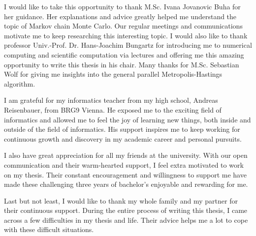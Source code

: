 I would like to take this opportunity to thank M.Sc. Ivana Jovanovic Buha for her guidance. Her explanations and advice greatly helped me understand the topic of Markov chain Monte Carlo. Our regular meetings and communications motivate me to keep researching this interesting topic. I would also like to thank professor Univ.-Prof. Dr. Hans-Joachim Bungartz for introducing me to numerical computing and scientific computation via lectures and offering me this amazing opportunity to write this thesis in his chair. Many thanks for M.Sc. Sebastian Wolf for giving me insights into the general parallel Metropolis-Hastings algorithm.

I am grateful for my informatics teacher from my high school, Andreas Reisenbauer, from BRG9 Vienna. He exposed me to the exciting field of informatics and allowed me to feel the joy of learning new things, both inside and outside of the field of informatics. His support inspires me to keep working for continuous growth and discovery in my academic career and personal pursuits.

I also have great appreciation for all my friends at the university. With our open communication and their warm-hearted support, I feel extra motivated to work on my thesis. Their constant encouragement and willingness to support me have made these challenging three years of bachelor's enjoyable and rewarding for me.

Last but not least, I would like to thank my whole family and my partner for their continuous support. During the entire process of writing this thesis, I came across a few difficulties in my thesis and life. Their advice helps me a lot to cope with these difficult situations.

